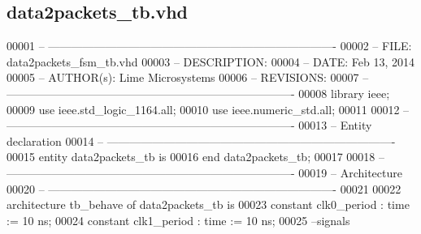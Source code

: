 \subsection{data2packets\+\_\+tb.\+vhd}
\label{data2packets__tb_8vhd_source}

\begin{DoxyCode}
00001 \textcolor{keyword}{-- ---------------------------------------------------------------------------- }
00002 \textcolor{keyword}{-- FILE:    data2packets\_fsm\_tb.vhd}
00003 \textcolor{keyword}{-- DESCRIPTION: }
00004 \textcolor{keyword}{-- DATE:    Feb 13, 2014}
00005 \textcolor{keyword}{-- AUTHOR(s):   Lime Microsystems}
00006 \textcolor{keyword}{-- REVISIONS:}
00007 \textcolor{keyword}{-- ---------------------------------------------------------------------------- }
00008 \textcolor{vhdlkeyword}{library }\textcolor{keywordflow}{ieee};
00009 \textcolor{vhdlkeyword}{use }ieee.std\_logic\_1164.\textcolor{keywordflow}{all};
00010 \textcolor{vhdlkeyword}{use }ieee.numeric\_std.\textcolor{keywordflow}{all};
00011 
00012 \textcolor{keyword}{-- ----------------------------------------------------------------------------}
00013 \textcolor{keyword}{-- Entity declaration}
00014 \textcolor{keyword}{-- ----------------------------------------------------------------------------}
00015 \textcolor{keywordflow}{entity }data2packets_tb \textcolor{keywordflow}{is}
00016 \textcolor{keywordflow}{end} \textcolor{vhdlchar}{data2packets\_tb};
00017 
00018 \textcolor{keyword}{-- ----------------------------------------------------------------------------}
00019 \textcolor{keyword}{-- Architecture}
00020 \textcolor{keyword}{-- ----------------------------------------------------------------------------}
00021 
00022 \textcolor{keywordflow}{architecture} tb\_behave \textcolor{keywordflow}{of} data2packets_tb is
00023 \textcolor{keywordflow}{constant} \textcolor{vhdlchar}{clk0_period}   \textcolor{vhdlchar}{:} \textcolor{comment}{time} \textcolor{vhdlchar}{:=} \textcolor{vhdllogic}{}\textcolor{vhdllogic}{10} \textcolor{vhdlchar}{ns};
00024 \textcolor{keywordflow}{constant} \textcolor{vhdlchar}{clk1_period}   \textcolor{vhdlchar}{:} \textcolor{comment}{time} \textcolor{vhdlchar}{:=} \textcolor{vhdllogic}{}\textcolor{vhdllogic}{10} \textcolor{vhdlchar}{ns}; 
00025 \textcolor{keyword}{   --signals}

\end{DoxyCode}
